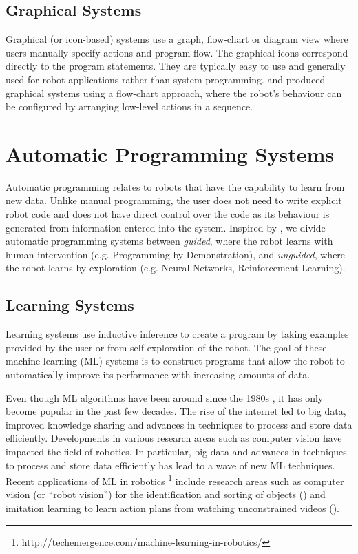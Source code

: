 \subsection{Graphical Systems}\label{sssec:Graphical systems}
Graphical (or icon-based) systems use a graph, flow-chart or diagram view where users manually specify actions and program flow. 
The graphical icons correspond directly to the program statements.
They are typically easy to use and generally used for robot applications rather than system programming. 
\cite{lego2003} and \cite{bischoff2002morpha} produced graphical systems using a flow-chart approach, where the robot's behaviour can be configured by arranging low-level actions in a sequence.


\section{Automatic Programming Systems}\label{subsec:Automatic Programming Systems}
Automatic programming relates to robots that have the capability to learn from new data.
Unlike manual programming, the user does not need to write explicit robot code and does not have direct control over the code as its behaviour is generated from information entered into the system.
Inspired by \cite{Biggs2003}, we divide automatic programming systems between \textit{guided}, where the robot learns with human intervention (e.g. Programming by Demonstration), and \textit{unguided}, where the robot learns by exploration (e.g. Neural Networks, Reinforcement Learning).

\subsection{Learning Systems}\label{sssec:Learning Systems}
Learning systems use inductive inference to create a program by taking examples provided by the user or from self-exploration of the robot. 
The goal of these machine learning (ML) systems is to construct programs that allow the robot to automatically improve its performance with increasing amounts of data. 

Even though ML algorithms have been around since the 1980s \cite{}, it has only become popular in the past few decades. 
The rise of the internet led to big data, improved knowledge sharing and advances in techniques to process and store data efficiently.
Developments in various research areas such as computer vision have impacted the field of robotics.
In particular, big data and advances in techniques to process and store data efficiently has lead to a wave of new ML techniques. 
Recent applications of ML in robotics \footnote{http://techemergence.com/machine-learning-in-robotics/} include research areas such as computer vision (or ``robot vision'') for the identification and sorting of objects (\cite{stager2013computer}) and imitation learning to learn action plans from watching unconstrained videos (\cite{Yang2015}).

